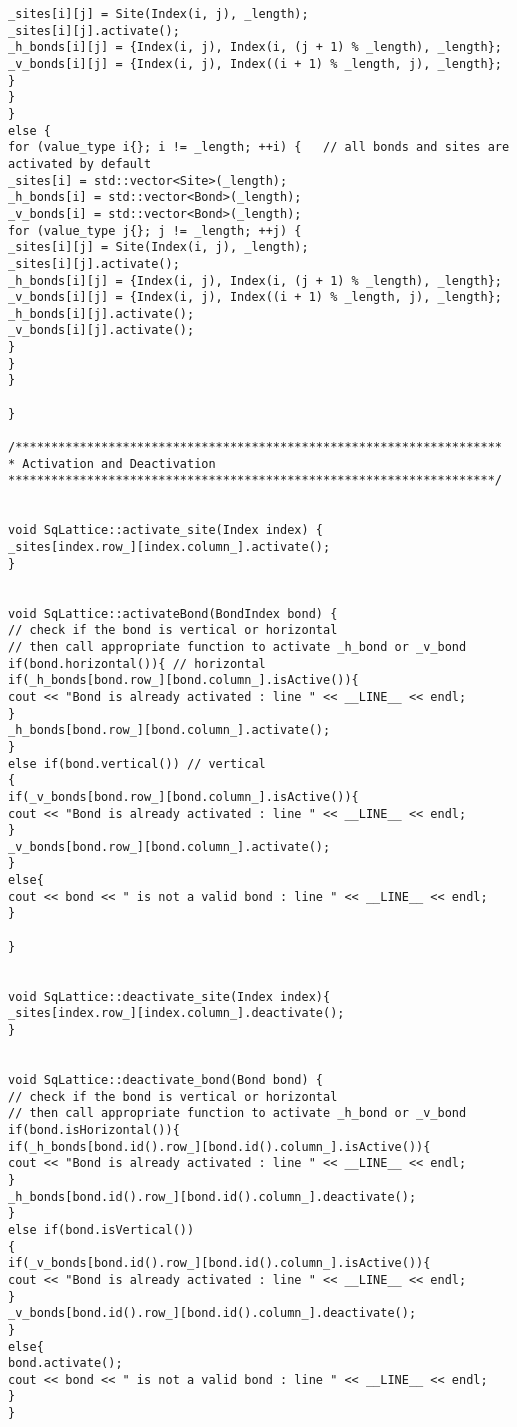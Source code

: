 \begin{lstlisting}[style=CStyle]
_sites[i][j] = Site(Index(i, j), _length);
_sites[i][j].activate();
_h_bonds[i][j] = {Index(i, j), Index(i, (j + 1) % _length), _length};
_v_bonds[i][j] = {Index(i, j), Index((i + 1) % _length, j), _length};
}
}
}
else {
for (value_type i{}; i != _length; ++i) {   // all bonds and sites are activated by default
_sites[i] = std::vector<Site>(_length);
_h_bonds[i] = std::vector<Bond>(_length);
_v_bonds[i] = std::vector<Bond>(_length);
for (value_type j{}; j != _length; ++j) {
_sites[i][j] = Site(Index(i, j), _length);
_sites[i][j].activate();
_h_bonds[i][j] = {Index(i, j), Index(i, (j + 1) % _length), _length};
_v_bonds[i][j] = {Index(i, j), Index((i + 1) % _length, j), _length};
_h_bonds[i][j].activate();
_v_bonds[i][j].activate();
}
}
}

}

/********************************************************************
* Activation and Deactivation
********************************************************************/


void SqLattice::activate_site(Index index) {
_sites[index.row_][index.column_].activate();
}


void SqLattice::activateBond(BondIndex bond) {
// check if the bond is vertical or horizontal
// then call appropriate function to activate _h_bond or _v_bond
if(bond.horizontal()){ // horizontal
if(_h_bonds[bond.row_][bond.column_].isActive()){
cout << "Bond is already activated : line " << __LINE__ << endl;
}
_h_bonds[bond.row_][bond.column_].activate();
}
else if(bond.vertical()) // vertical
{
if(_v_bonds[bond.row_][bond.column_].isActive()){
cout << "Bond is already activated : line " << __LINE__ << endl;
}
_v_bonds[bond.row_][bond.column_].activate();
}
else{
cout << bond << " is not a valid bond : line " << __LINE__ << endl;
}

}


void SqLattice::deactivate_site(Index index){
_sites[index.row_][index.column_].deactivate();
}


void SqLattice::deactivate_bond(Bond bond) {
// check if the bond is vertical or horizontal
// then call appropriate function to activate _h_bond or _v_bond
if(bond.isHorizontal()){
if(_h_bonds[bond.id().row_][bond.id().column_].isActive()){
cout << "Bond is already activated : line " << __LINE__ << endl;
}
_h_bonds[bond.id().row_][bond.id().column_].deactivate();
}
else if(bond.isVertical())
{
if(_v_bonds[bond.id().row_][bond.id().column_].isActive()){
cout << "Bond is already activated : line " << __LINE__ << endl;
}
_v_bonds[bond.id().row_][bond.id().column_].deactivate();
}
else{
bond.activate();
cout << bond << " is not a valid bond : line " << __LINE__ << endl;
}
}



\end{lstlisting}
